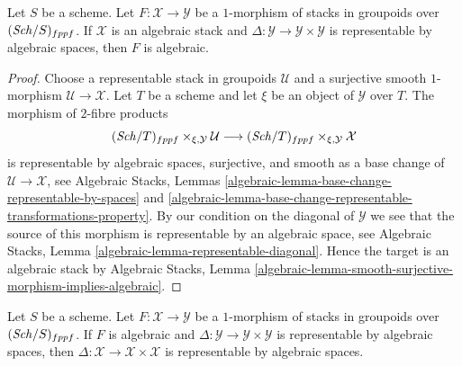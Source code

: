 \begin{lemma}
\label{lemma-map-from-algebraic}
Let $S$ be a scheme. Let $F : \mathcal{X} \to \mathcal{Y}$ be a $1$-morphism
of stacks in groupoids over $(\mathit{Sch}/S)_{fppf}$. If $\mathcal{X}$ is an
algebraic stack and $\Delta : \mathcal{Y} \to \mathcal{Y} \times \mathcal{Y}$
is representable by algebraic spaces, then $F$ is algebraic.
\end{lemma}

\begin{proof}
Choose a representable stack in groupoids $\mathcal{U}$ and a surjective
smooth $1$-morphism $\mathcal{U} \to \mathcal{X}$. Let $T$ be a scheme and
let $\xi$ be an object of $\mathcal{Y}$ over $T$. The morphism of
$2$-fibre products
$$
(\mathit{Sch}/T)_{fppf} \times_{\xi, \mathcal{Y}} \mathcal{U}
\longrightarrow
(\mathit{Sch}/T)_{fppf} \times_{\xi, \mathcal{Y}} \mathcal{X}
$$
is representable by algebraic spaces, surjective, and smooth as a
base change of $\mathcal{U} \to \mathcal{X}$, see
Algebraic Stacks,
Lemmas \ref{algebraic-lemma-base-change-representable-by-spaces} and
\ref{algebraic-lemma-base-change-representable-transformations-property}.
By our condition on the diagonal of $\mathcal{Y}$ we see that
the source of this morphism is representable by an algebraic space, see
Algebraic Stacks, Lemma \ref{algebraic-lemma-representable-diagonal}.
Hence the target is an algebraic stack by
Algebraic Stacks,
Lemma \ref{algebraic-lemma-smooth-surjective-morphism-implies-algebraic}.
\end{proof}

\begin{lemma}
\label{lemma-diagonals-and-algebraic-morphisms}
Let $S$ be a scheme. Let $F : \mathcal{X} \to \mathcal{Y}$ be a $1$-morphism
of stacks in groupoids over $(\mathit{Sch}/S)_{fppf}$.
If $F$ is algebraic and
$\Delta : \mathcal{Y} \to \mathcal{Y} \times \mathcal{Y}$
is representable by algebraic spaces, then
$\Delta : \mathcal{X} \to \mathcal{X} \times \mathcal{X}$
is representable by algebraic spaces.
\end{lemma}

